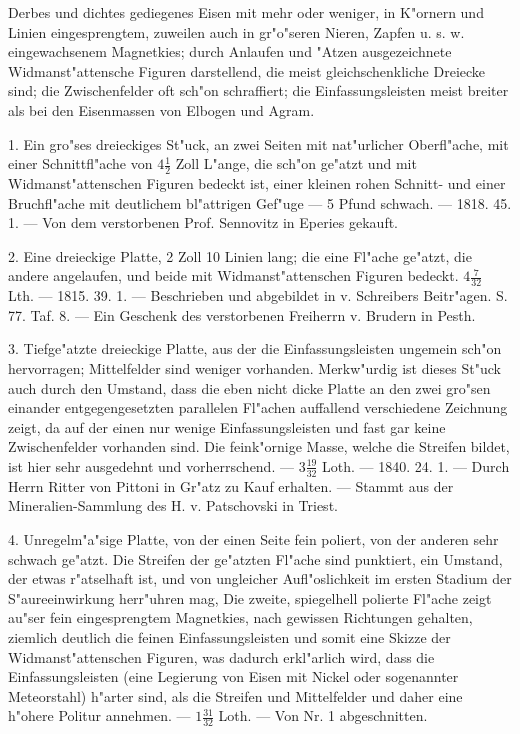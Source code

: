 \documentclass[a4paper, 11pt, oneside, polutonikogreek, german]{article}
\begin{document}
Derbes und dichtes gediegenes Eisen mit mehr oder weniger, in K"ornern und Linien eingesprengtem, zuweilen auch in gr"o"seren Nieren, Zapfen u. s. w. eingewachsenem Magnetkies; durch Anlaufen und "Atzen ausgezeichnete Widmanst"attensche Figuren darstellend, die meist gleichschenkliche Dreiecke sind; die Zwischenfelder oft sch"on schraffiert; die Einfassungsleisten meist breiter als bei den Eisenmassen von Elbogen und Agram.

1. Ein gro"ses dreieckiges St"uck, an zwei Seiten mit nat"urlicher Oberfl"ache, mit einer Schnittfl"ache von $4\frac{1}{2}$ Zoll L"ange, die sch"on ge"atzt und mit Widmanst"attenschen Figuren bedeckt ist, einer kleinen rohen Schnitt- und einer Bruchfl"ache mit deutlichem bl"attrigen Gef"uge --- 5 Pfund schwach. --- 1818. 45. 1. --- Von dem verstorbenen Prof. Sennovitz in Eperies gekauft.

2. Eine dreieckige Platte, 2 Zoll 10 Linien lang; die eine Fl"ache ge"atzt, die andere angelaufen, und beide mit Widmanst"attenschen Figuren bedeckt. $4\frac{7}{32}$ Lth. --- 1815. 39. 1. --- Beschrieben und abgebildet in v. Schreibers Beitr"agen. S. 77. Taf. 8. --- Ein Geschenk des verstorbenen Freiherrn v. Brudern in Pesth.

3. Tiefge"atzte dreieckige Platte, aus der die Einfassungsleisten ungemein sch"on hervorragen; Mittelfelder sind weniger vorhanden. Merkw"urdig ist dieses St"uck auch durch den Umstand, dass die eben nicht dicke Platte an den zwei gro"sen einander entgegengesetzten parallelen Fl"achen auffallend verschiedene Zeichnung zeigt, da auf der einen nur wenige Einfassungsleisten und fast gar keine Zwischenfelder vorhanden sind. Die feink"ornige Masse, welche die Streifen bildet, ist hier sehr ausgedehnt und vorherrschend. --- $3\frac{19}{32}$ Loth. --- 1840. 24. 1. --- Durch Herrn Ritter von Pittoni in Gr"atz zu Kauf erhalten. --- Stammt aus der Mineralien-Sammlung des H. v. Patschovski in Triest.

4. Unregelm"a"sige Platte, von der einen Seite fein poliert, von der anderen sehr schwach ge"atzt. Die Streifen der ge"atzten Fl"ache sind punktiert, ein Umstand, der etwas r"atselhaft ist, und von ungleicher Aufl"oslichkeit im ersten Stadium der S"aureeinwirkung herr"uhren mag, Die zweite, spiegelhell polierte Fl"ache zeigt au"ser fein eingesprengtem Magnetkies, nach gewissen Richtungen gehalten, ziemlich deutlich die feinen Einfassungsleisten und somit eine Skizze der Widmanst"attenschen Figuren, was dadurch erkl"arlich wird, dass die Einfassungsleisten (eine Legierung von Eisen mit Nickel oder sogenannter Meteorstahl) h"arter sind, als die Streifen und Mittelfelder und daher eine h"ohere Politur annehmen. --- $1\frac{31}{32}$ Loth. --- Von Nr. 1 abgeschnitten.
\end{document}
